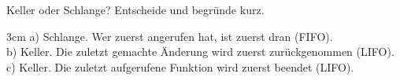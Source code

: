 \question[3]
Keller oder Schlange? Entscheide und begründe kurz.
\begin{solutionbox}{3cm}
a) Schlange. Wer zuerst angerufen hat, ist zuerst dran (FIFO). \\
b) Keller. Die zuletzt gemachte Änderung wird zuerst zurückgenommen (LIFO). \\
c) Keller. Die zuletzt aufgerufene Funktion wird zuerst beendet (LIFO).
\end{solutionbox}
